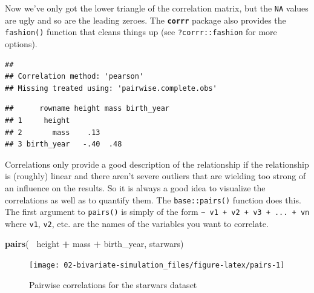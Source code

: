 \documentclass[]{book}
\newenvironment{Shaded}{\begin{snugshade}}{\end{snugshade}}
\newcommand{\KeywordTok}[1]{\textcolor[rgb]{0.13,0.29,0.53}{\textbf{#1}}}
\newcommand{\NormalTok}[1]{#1}
\newcommand{\OperatorTok}[1]{\textcolor[rgb]{0.81,0.36,0.00}{\textbf{#1}}}
\newcommand{\StringTok}[1]{\textcolor[rgb]{0.31,0.60,0.02}{#1}}
\begin{document}
Now we've only got the lower triangle of the correlation matrix, but the \texttt{NA} values are ugly and so are the leading zeroes. The \textbf{\texttt{corrr}} package also provides the \texttt{fashion()} function that cleans things up (see \texttt{?corrr::fashion} for more options).

\begin{Shaded}
\end{Shaded}

\begin{verbatim}
## 
## Correlation method: 'pearson'
## Missing treated using: 'pairwise.complete.obs'
\end{verbatim}

\begin{verbatim}
##      rowname height mass birth_year
## 1     height                       
## 2       mass    .13                
## 3 birth_year   -.40  .48
\end{verbatim}

Correlations only provide a good description of the relationship if the relationship is (roughly) linear and there aren't severe outliers that are wielding too strong of an influence on the results. So it is always a good idea to visualize the correlations as well as to quantify them. The \texttt{base::pairs()} function does this. The first argument to \texttt{pairs()} is simply of the form \texttt{\textasciitilde{}\ v1\ +\ v2\ +\ v3\ +\ ...\ +\ vn} where \texttt{v1}, \texttt{v2}, etc. are the names of the variables you want to correlate.

\begin{Shaded}
\begin{Highlighting}[]
\KeywordTok{pairs}\NormalTok{(}\OperatorTok{~}\StringTok{ }\NormalTok{height }\OperatorTok{+}\StringTok{ }\NormalTok{mass }\OperatorTok{+}\StringTok{ }\NormalTok{birth_year, starwars)}
\end{Highlighting}
\end{Shaded}

\begin{figure}

{\centering \texttt{[image: 02-bivariate-simulation\_files/figure-latex/pairs-1]} 

}

\caption{Pairwise correlations for the starwars dataset}\label{fig:pairs}
\end{figure}
\end{document}
